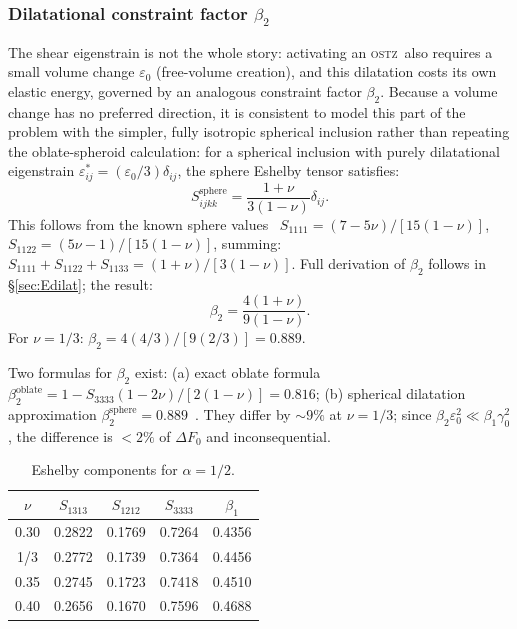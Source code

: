 \documentclass[3p]{elsarticle}
\newcommand{\OSTZ}{\textsc{ostz}}
\newcommand{\dF}{\Delta F_0}
\newcommand{\gz}{\gamma_0}
\begin{document}
\subsubsection{Dilatational constraint factor $\beta_2$}
\label{sec:beta2}

The shear eigenstrain is not the whole story: activating an \OSTZ\
also requires a small volume change $\varepsilon_0$ (free-volume
creation), and this dilatation costs its own elastic energy,
governed by an analogous constraint factor $\beta_2$. Because a
volume change has no preferred direction, it is consistent to model
this part of the problem with the simpler, fully isotropic spherical
inclusion rather than repeating the oblate-spheroid calculation: for
a spherical inclusion with purely dilatational eigenstrain
$\varepsilon^*_{ij}=(\varepsilon_0/3)\delta_{ij}$, the sphere Eshelby
tensor satisfies:
\begin{equation}
  S_{ijkk}^\text{sphere}=\frac{1+\nu}{3(1-\nu)}\delta_{ij}.
  \label{eq:Sijkk}
\end{equation}
This follows from the known sphere values~\citep{mura1987}
$S_{1111}=(7-5\nu)/[15(1-\nu)]$,
$S_{1122}=(5\nu-1)/[15(1-\nu)]$, summing:
$S_{1111}+S_{1122}+S_{1133}=(1+\nu)/[3(1-\nu)]$. Full derivation
of $\beta_2$ follows in \S\ref{sec:Edilat}; the result:
\begin{equation}
  \boxed{\beta_2=\frac{4(1+\nu)}{9(1-\nu)}.}
  \label{eq:beta2}
\end{equation}
For $\nu=1/3$: $\beta_2=4(4/3)/[9(2/3)]=0.889$.

Two formulas for $\beta_2$ exist: (a) exact oblate formula
$\beta_2^\text{oblate}=1-S_{3333}(1-2\nu)/[2(1-\nu)]=0.816$;
(b) spherical dilatation approximation $\beta_2^\text{sphere}=0.889$~\citep{pad-part1}.
They differ by $\sim9\%$ at $\nu=1/3$;
since $\beta_2\varepsilon_0^2\ll\beta_1\gz^2$, the difference is
$<2\%$ of $\dF$ and inconsequential.

\begin{table}[htbp]
\centering
\small
\caption{Eshelby components for $\alpha=1/2$.}
\label{tab:eshelby}
\begin{tabular}{ccccc}
\toprule
$\nu$ & $S_{1313}$ & $S_{1212}$ & $S_{3333}$ & $\beta_1$\\
\midrule
0.30 & 0.2822 & 0.1769 & 0.7264 & 0.4356\\
1/3  & 0.2772 & 0.1739 & 0.7364 & 0.4456\\
0.35 & 0.2745 & 0.1723 & 0.7418 & 0.4510\\
0.40 & 0.2656 & 0.1670 & 0.7596 & 0.4688\\
\bottomrule
\end{tabular}
\end{table}
\end{document}
